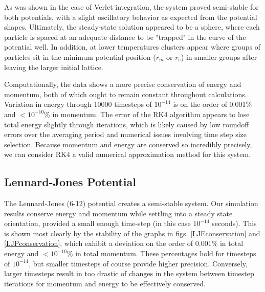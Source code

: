 \documentclass[12pt]{article}
\begin{document}
As was shown in the case of Verlet integration, the system proved semi-stable for both potentials, with a slight oscillatory behavior as expected from the potential shapes.  Ultimately, the steady-state solution appeared to be a sphere, where each particle is spaced at an adequate distance to be "trapped" in the curve of the potential well.  In addition, at lower temperatures clusters appear where groups of particles sit in the minimum potential position ($r_m$ or $r_e$) in smaller groups after leaving the larger initial lattice.

Computationally, the data shows a more precise conservation of energy and momentum, both of which ought to remain constant throughout calculations.  Variation in energy through 10000 timesteps of $10^{-14}$ is on the order of 0.001\% and $< 10^{-10}$\% in momentum.  The error of the RK4 algorithm appears to lose total energy slightly through iterations, which is likely caused by low roundoff errors over the averaging period and numerical issues involving time step size selection.  Because momentum and energy are conserved so incredibly precisely, we can consider RK4 a valid numerical approximation method for this system.

\subsection*{Lennard-Jones Potential}
The Lennard-Jones (6-12) potential creates a semi-stable system.  Our simulation results conserve energy and momentum while settling into a steady state orientation, provided a small enough time-step (in this case $10^{-14}$ seconds).  This is shown most clearly by the stability of the graphs in figs. \ref{LJEconservation} and \ref{LJPconservation}, which  exhibit a deviation on the order of 0.001\% in total energy and $< 10^{-10}$\% in total momentum.  These percentages hold for timesteps of $10^{-14}$, but smaller timesteps of course provide higher precision.  Conversely, larger timesteps result in too drastic of changes in the system between timestep iterations for momentum and energy to be effectively conserved.
\end{document}
